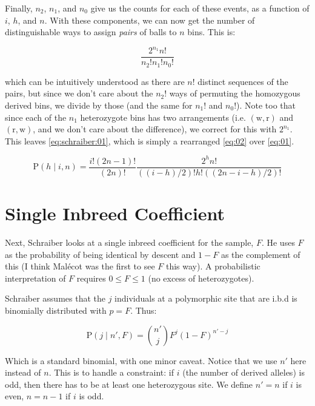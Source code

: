 \documentclass[12pt]{article}\usepackage[]{graphicx}\usepackage[]{color}
\begin{document}
Finally, $n_2$, $n_1$, and $n_0$ give us the counts for each of these
events, as a function of $i$, $h$, and $n$. With these components, we
can now get the number of distinguishable ways to assign \emph{pairs}
of balls to $n$ bins. This is:

\begin{equation} \label{eq:02}
\frac{2^{n_1} n!}{n_2! n_1! n_0!}
\end{equation}

which can be intuitively understood as there are $n!$ distinct
sequences of the pairs, but since we don't care about the $n_2!$ ways
of permuting the homozygous derived bins, we divide by those (and the
same for $n_1!$ and $n_0!$). Note too that since each of the $n_1$
heterozygote bins has two arrangements (i.e. $(\text{w}, \text{r})$
and $(\text{r}, \text{w})$, and we don't care about the difference),
we correct for this with $2^{n_1}$. This leaves
\autoref{eq:schraiber:01}, which is simply a rearranged
\autoref{eq:02} over \autoref{eq:01}.

\begin{equation} \label{eq:schraiber:01}
  \text{P}(h \mid i, n) = \frac{i!(2n-1)!}{(2n)!}\frac{2^h n!}{((i-h)/2)!h!((2n - i - h)/2)!}
\end{equation}

\section{Single Inbreed Coefficient}

Next, Schraiber looks at a single inbreed coefficient for the sample,
$F$. He uses $F$ as the probability of being identical by descent and
$1-F$ as the complement of this (I think Mal\'{e}cot was the first to
see $F$ this way). A probabilistic interpretation of $F$ requires $0
\le F \le 1$ (no excess of heterozygotes).

Schraiber assumes that the $j$ individuals at a polymorphic site that
are i.b.d is binomially distributed with $p = F$. Thus:

\begin{equation} \label{eq:schraiber:02}
\text{P}(j \mid n', F) = {n' \choose j} F^j (1-F)^{n' - j}
\end{equation}

Which is a standard binomial, with one minor caveat. Notice that we
use $n'$ here instead of $n$. This is to handle a constraint: if $i$
(the number of derived alleles) is odd, then there has to be at least
one heterozygous site. We define $n' = n$ if $i$ is even, $n = n - 1$
if $i$ is odd.
\end{document}

